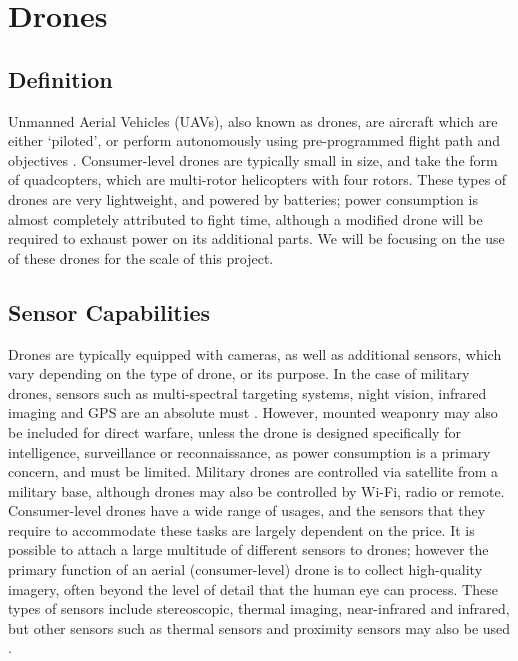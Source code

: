 \documentclass[12pt,a4paper,twoside]{report}
\begin{document}
	\section{Drones}
		\subsection{Definition}
		Unmanned Aerial Vehicles (UAVs), also known as drones, are aircraft which are either ‘piloted’, or perform autonomously using pre-programmed flight path and objectives \citep{chriscolejimwright2010}. Consumer-level drones are typically small in size, and take the form of quadcopters, which are multi-rotor helicopters with four rotors.  These types of drones are very lightweight, and powered by batteries; power consumption is almost completely attributed to fight time, although a modified drone will be required to exhaust power on its additional parts. We will be focusing on the use of these drones for the scale of this project.
		\subsection{Sensor Capabilities}
		Drones are typically equipped with cameras, as well as additional sensors, which vary depending on the type of drone, or its purpose. In the case of military drones, sensors such as multi-spectral targeting systems, night vision, infrared imaging and GPS are an absolute must \citep{ u.s.airforce2015}. However, mounted weaponry may also be included for direct warfare, unless the drone is designed specifically for intelligence, surveillance or reconnaissance, as power consumption is a primary concern, and must be limited. Military drones are controlled via satellite from a military base, although drones may also be controlled by Wi-Fi, radio or remote. Consumer-level drones have a wide range of usages, and the sensors that they require to accommodate these tasks are largely dependent on the price. It is possible to attach a large multitude of different sensors to drones; however the primary function of an aerial (consumer-level) drone is to collect high-quality imagery, often beyond the level of detail that the human eye can process.  These types of sensors include stereoscopic, thermal imaging, near-infrared and infrared, but other sensors such as thermal sensors and proximity sensors may also be used \citep{ questuav2015}.
\end{document}
